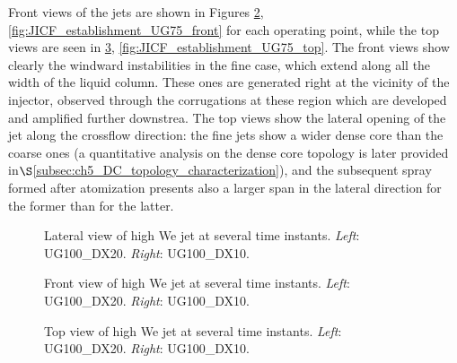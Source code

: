 Front views of the jets are shown in Figures \ref{fig:JICF_establishment_UG100_front}, \ref{fig:JICF_establishment_UG75_front} for each operating point, while the top views are seen in \ref{fig:JICF_establishment_UG100_top}, \ref{fig:JICF_establishment_UG75_top}. The front views show clearly the windward instabilities in the fine case, which extend along all the width of the liquid column. These ones are generated right at the vicinity of the injector, observed through the corrugations at these region which are developed and amplified further downstrea. The top views show the lateral opening of the jet along the crossflow direction: the fine jets show a wider dense core than the coarse ones (a quantitative analysis on the dense core topology is later provided in$\S$\ref{subsec:ch5_DC_topology_characterization}), and the subsequent spray formed after atomization presents also a larger span in the lateral direction for the former than for the latter.


\clearpage

\begin{figure}[ht]
\centering
{}
\caption[Lateral view of high We jet at several time instants. ]{Lateral view of high We jet at several time instants. \textsl{Left}: UG100\_DX20. \textsl{Right}: UG100\_DX10.}
\label{fig:JICF_establishment_UG100_lateral}
\end{figure}

\clearpage

\begin{figure}[ht]
\centering
{}
\caption[Front view of high We jet at several time instants. ]{Front view of high We jet at several time instants. \textsl{Left}: UG100\_DX20. \textsl{Right}: UG100\_DX10.}
\label{fig:JICF_establishment_UG100_front}
\end{figure}


\clearpage

\begin{figure}[ht]
\centering
{}
\caption[Top view of high We jet at several time instants. ]{Top view of high We jet at several time instants. \textsl{Left}: UG100\_DX20. \textsl{Right}: UG100\_DX10.}
\label{fig:JICF_establishment_UG100_top}
\end{figure}




